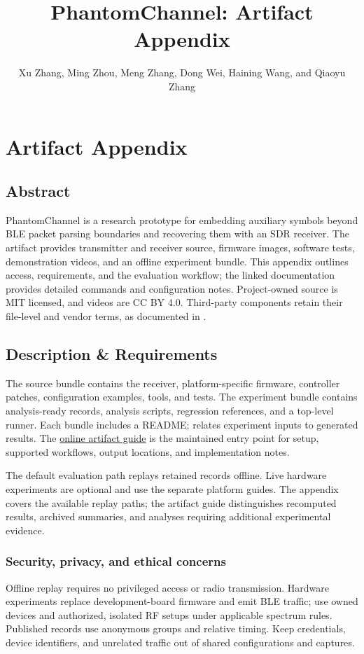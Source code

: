 \documentclass[nonacm,sigconf]{acmart}
\newcommand{\artifactguide}{\href{https://github.com/Tincyu/PhantomChannel/blob/main/docs/artifact-guide.md}{online artifact guide}}
\begin{document}
\title{PhantomChannel: Artifact Appendix}
\author{Xu Zhang, Ming Zhou, Meng Zhang, Dong Wei, Haining Wang, and Qiaoyu Zhang}
\renewcommand{\shortauthors}{Xu Zhang et al.}
\maketitle
\appendix
\section{Artifact Appendix}

\subsection{Abstract}
PhantomChannel is a research prototype for embedding auxiliary symbols beyond
BLE packet parsing boundaries and recovering them with an SDR receiver.
The artifact provides transmitter and receiver source, firmware images,
software tests, demonstration videos, and an offline experiment bundle.
This appendix outlines access, requirements, and the evaluation workflow;
the linked documentation provides detailed commands and configuration notes.
Project-owned source is MIT licensed, and videos are CC BY 4.0. Third-party
components retain their file-level and vendor terms, as documented in
.

\subsection{Description \& Requirements}
The source bundle contains the receiver, platform-specific firmware,
controller patches, configuration examples, tools, and tests. The experiment
bundle contains analysis-ready records, analysis scripts, regression
references, and a top-level runner. Each bundle includes a README;
 relates experiment inputs to generated results.
The \artifactguide{} is the maintained entry point for setup, supported
workflows, output locations, and implementation notes.

The default evaluation path replays retained records offline. Live hardware
experiments are optional and use the separate platform guides. The appendix
covers the available replay paths; the artifact guide distinguishes
recomputed results, archived summaries, and analyses requiring additional
experimental evidence.

\subsubsection{Security, privacy, and ethical concerns}
Offline replay requires no privileged access or radio transmission. Hardware
experiments replace development-board firmware and emit BLE traffic; use owned
devices and authorized, isolated RF setups under applicable spectrum rules.
Published records use anonymous groups and relative timing. Keep credentials,
device identifiers, and unrelated traffic out of shared configurations and
captures.
\end{document}
